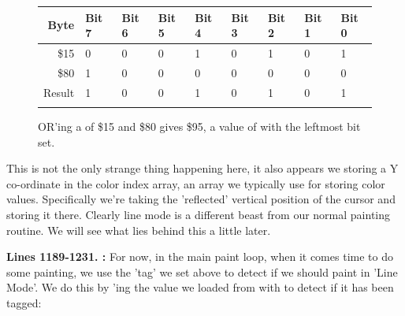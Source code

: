 \begin{figure}[H]
  {
    \setlength{\tabcolsep}{3.0pt}
    \setlength\cmidrulewidth{\heavyrulewidth} %
    \begin{adjustbox}{width=7cm,center}

      \begin{tabular}{rllllllll}
        \toprule
        Byte & Bit 7 & Bit 6 & Bit 5 & Bit 4 & Bit 3 & Bit 2 & Bit 1 & Bit 0        \\
        \midrule
        \$15 & 0 & 0 & 0 & 1 & 0 & 1 & 0 & 1 \\
        \$80 & 1 & 0 & 0 & 0 & 0 & 0 & 0 & 0 \\
        \midrule
      Result & 1 & 0 & 0 & 1 & 0 & 1 & 0 & 1 \\
        \addlinespace
        \bottomrule
      \end{tabular}

    \end{adjustbox}

  }\caption*{OR'ing a  of \$15 and \$80 gives \$95, a value of  with the leftmost bit set.}
\end{figure}

This is not the only strange thing happening here, it also 
appears we storing a Y co-ordinate in the color index array, an array we typically use for
storing color values. Specifically we're taking the 'reflected' vertical position of the 
cursor and storing it there. Clearly line mode is a different beast from our normal painting routine. We will
see what lies behind this a little later.


\textbf{Lines 1189-1231. :} For now, in the main paint loop, when it comes time to do some
painting, we use the 'tag' we set above to detect if we should paint in 'Line Mode'. We do this by 'ing the
value we loaded from  with  to detect if it has been tagged:

